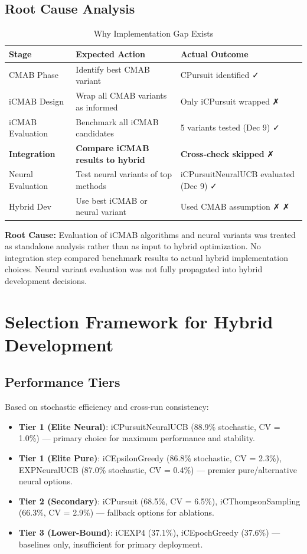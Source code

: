 \documentclass[12pt,a4paper]{article}
\newcommand{\warning}[1]{\textcolor{warningred}{\textbf{#1}}}
\begin{document}
\subsection{Root Cause Analysis}

\begin{table}[H]
\centering
\caption{Why Implementation Gap Exists}
\begin{tabular}{@{}lll@{}}
\toprule
\textbf{Stage} & \textbf{Expected Action} & \textbf{Actual Outcome} \\
\midrule
CMAB Phase & Identify best CMAB variant & CPursuit identified ✓ \\
iCMAB Design & Wrap all CMAB variants as informed & Only iCPursuit wrapped ✗ \\
iCMAB Evaluation & Benchmark all iCMAB candidates & 5 variants tested (Dec 9) ✓ \\
\warning{Integration} & \warning{Compare iCMAB results to hybrid} & \warning{Cross-check skipped} ✗ \\
Neural Evaluation & Test neural variants of top methods & iCPursuitNeuralUCB evaluated (Dec 9) ✓ \\
Hybrid Dev & Use best iCMAB or neural variant & Used CMAB assumption ✗ ✗ \\
\bottomrule
\end{tabular}
\end{table}

\textbf{Root Cause:} Evaluation of iCMAB algorithms and neural variants was treated as standalone analysis rather than as input to hybrid optimization. No integration step compared benchmark results to actual hybrid implementation choices. Neural variant evaluation was not fully propagated into hybrid development decisions.

\section{Selection Framework for Hybrid Development}

\subsection{Performance Tiers}

Based on stochastic efficiency and cross-run consistency:

\begin{itemize}
\item \textbf{Tier 1 (Elite Neural)}: iCPursuitNeuralUCB (88.9\% stochastic, CV = 1.0\%) --- primary choice for maximum performance and stability.
\item \textbf{Tier 1 (Elite Pure)}: iCEpsilonGreedy (86.8\% stochastic, CV = 2.3\%), EXPNeuralUCB (87.0\% stochastic, CV = 0.4\%) --- premier pure/alternative neural options.
\item \textbf{Tier 2 (Secondary)}: iCPursuit (68.5\%, CV = 6.5\%), iCThompsonSampling (66.3\%, CV = 2.9\%) --- fallback options for ablations.
\item \textbf{Tier 3 (Lower-Bound)}: iCEXP4 (37.1\%), iCEpochGreedy (37.6\%) --- baselines only, insufficient for primary deployment.
\end{itemize}
\end{document}
